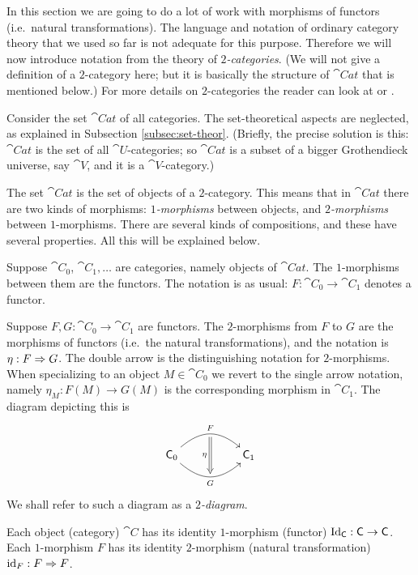 In this section we are going to do a lot of work with morphisms of functors 
(i.e.\ natural transformations). The language and notation of ordinary category 
theory that we used so far is not adequate for this purpose. Therefore we will 
now introduce notation from the theory of {\em $2$-categories}.
(We will not give a definition of a $2$-category here; but it is basically the 
structure of $\cat{Cat}$ that is mentioned below.) 
For more details on $2$-categories the reader 
can look at \cite{Mac2} or \cite[Section 1]{Ye7}.

Consider the set $\cat{Cat}$ of all categories. The set-theoretical aspects 
are neglected, as explained in Subsection \ref{subsec:set-theor}.
(Briefly, the precise solution is this: $\cat{Cat}$ is the set of all 
$\cat{U}$-categories; so $\cat{Cat}$ is a subset of a bigger Grothendieck 
universe, say $\cat{V}$, and it is a $\cat{V}$-category.)

The set $\cat{Cat}$ is the set of objects of a $2$-category.
This means that in $\cat{Cat}$ there are two kinds of morphisms: 
{\em $1$-morphisms} between objects, and {\em $2$-morphisms} between 
$1$-morphisms. There are several kinds of compositions, and these have several 
properties. All this will be explained below. 

Suppose $\cat{C}_0$, $\cat{C}_1, \ldots$ are categories, namely 
objects of $\cat{Cat}$. The $1$-morph\-isms between them are the functors.
The notation is as usual: $F : \cat{C}_0 \to \cat{C}_1$ denotes a functor.

Suppose $F, G : \cat{C}_0 \to \cat{C}_1$ are functors. The $2$-morphisms from 
$F$ to $G$ are the morphisms of functors 
(i.e.\ the natural transformations), and the notation is 
$\eta : F \Rightarrow G$. The double arrow is the distinguishing notation for  
$2$-morphisms. When specializing to an object
$M \in \cat{C}_0$ we revert to the single arrow notation, namely 
$\eta_M : F(M) \to G(M)$ is the corresponding morphism in $\cat{C}_1$. 
The diagram depicting this is
\[ \UseTips  \xymatrix @C=12ex @R=6ex {
\cat{C}_0
\ar@(ur,ul)[r]^(0.5){F} _(0.5){}="eta-s"
\ar@(dr,dl)[r]_(0.5){G}  ^(0.5){}="eta-t"
\ar@{=>}  "eta-s";"eta-t" _(0.5){\eta}
&
\cat{C}_1
} \]
We shall refer to such a diagram as a {\em $2$-diagram}. 

Each object (category) $\cat{C}$ has its identity $1$-morphism  (functor)
$\operatorname{Id}_{\operatorname{\mathsf{C}}} : \operatorname{\mathsf{C}} \to \operatorname{\mathsf{C}}$.  
Each $1$-morphism $F$ has its identity $2$-morphism (natural transformation)
$\operatorname{id}_F : F \Rightarrow F$.  

